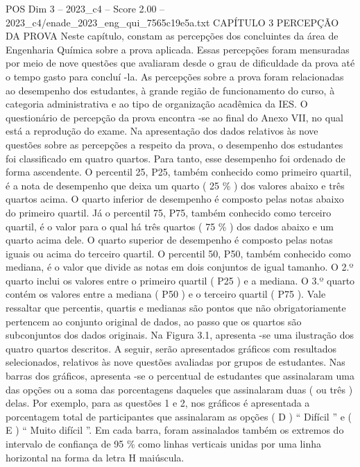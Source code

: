 \begin{textsample}{POS Dim 3 – 2023\_c4 – Score 2.00 – 2023\_c4/enade\_2023\_eng\_qui\_7565c19e5a.txt}  \label{ex:f3_pos_098}
CAPÍTULO 3 PERCEPÇÃO DA PROVA Neste capítulo, constam as percepções dos concluintes da área de Engenharia Química sobre a prova aplicada.
Essas percepções foram mensuradas por meio de nove questões que avaliaram desde o grau de dificuldade da prova até o tempo gasto para concluí -la.
As percepções sobre a prova foram relacionadas ao desempenho dos estudantes, à grande região de funcionamento do curso, à categoria administrativa e ao tipo de organização acadêmica da IES.
O questionário de percepção da prova encontra -se ao final do Anexo VII, no qual está a reprodução do exame.
Na apresentação dos dados relativos às nove questões sobre as percepções a respeito da prova, o desempenho dos estudantes foi classificado em quatro quartos.
Para tanto, esse desempenho foi ordenado de forma ascendente.
O percentil 25, P25, também conhecido como primeiro quartil, é a nota de desempenho que deixa um quarto ( 25 \% ) dos valores abaixo e três quartos acima.
O quarto inferior de desempenho é composto pelas notas abaixo do primeiro quartil.
Já o percentil 75, P75, também conhecido como terceiro quartil, é o valor para o qual há três quartos ( 75 \% ) dos dados abaixo e um quarto acima dele.
O quarto superior de desempenho é composto pelas notas iguais ou acima do terceiro quartil.
O percentil 50, P50, também conhecido como mediana, é o valor que divide as notas em dois conjuntos de igual tamanho.
O 2.º quarto inclui os valores entre o primeiro quartil ( P25 ) e a mediana.
O 3.º quarto contém os valores entre a mediana ( P50 ) e o terceiro quartil ( P75 ).
Vale ressaltar que percentis, quartis e medianas são pontos que não obrigatoriamente pertencem ao conjunto original de dados, ao passo que os quartos são subconjuntos dos dados originais.
Na Figura 3.1, apresenta -se uma ilustração dos quatro quartos descritos.
A seguir, serão apresentados gráficos com resultados selecionados, relativos às nove questões avaliadas por grupos de estudantes.
Nas barras dos gráficos, apresenta -se o percentual de estudantes que assinalaram uma das opções ou a soma das porcentagens daqueles que assinalaram duas ( ou três ) delas.
Por exemplo, para as questões 1 e 2, nos gráficos é apresentada a porcentagem total de participantes que assinalaram as opções ( D ) “ Difícil ” e ( E ) “ Muito difícil ”.
Em cada barra, foram assinalados também os extremos do intervalo de confiança de 95 \% como linhas verticais unidas por uma linha horizontal na forma da letra H maiúscula.

\end{textsample}
